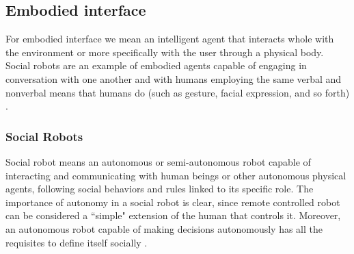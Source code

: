 \documentclass{thesisreport}
\begin{document}
\subsection{Embodied interface}
For embodied interface we mean an intelligent agent that interacts whole with the environment or more specifically with the user through a physical body. Social robots are an example of embodied agents capable of engaging in conversation with one another and with humans employing the same verbal and nonverbal means that humans do (such as gesture, facial expression, and so forth) \cite{serenko2007end}.
\subsubsection{Social Robots}
Social robot means an autonomous or semi-autonomous robot capable of interacting and communicating with human beings or other autonomous physical agents, following social behaviors and rules linked to its specific role. The importance of autonomy in a social robot is clear, since remote controlled robot can be considered a ``simple" extension of the human that controls it. Moreover, an autonomous robot capable of making decisions autonomously has all the requisites to define itself socially \cite{broekens2009assistive}.
 
\end{document}
